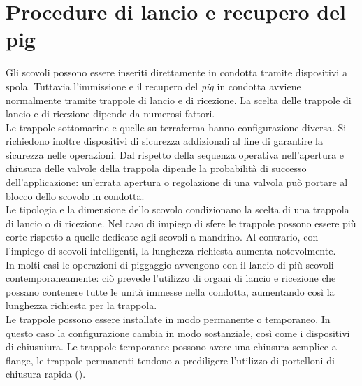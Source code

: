 
\section{Procedure di lancio e recupero del pig}
Gli scovoli possono essere inseriti direttamente in condotta tramite dispositivi a spola. Tuttavia l'immissione e il recupero del \textit{pig} in condotta avviene normalmente tramite trappole di lancio e di ricezione. La scelta delle trappole di lancio e di ricezione dipende da numerosi fattori.\\
Le trappole sottomarine e quelle su terraferma hanno configurazione diversa. Si richiedono inoltre dispositivi di sicurezza addizionali al fine di garantire la sicurezza nelle operazioni. Dal rispetto della sequenza operativa nell'apertura e chiusura delle valvole della trappola dipende la probabilità di successo dell'applicazione: un'errata apertura o regolazione di una valvola può portare al blocco dello scovolo in condotta.\\
Le tipologia e la dimensione dello scovolo condizionano la scelta di una trappola di lancio o di ricezione. Nel caso di impiego di sfere le trappole possono essere più corte rispetto a quelle dedicate agli scovoli a mandrino. Al contrario, con l'impiego di scovoli intelligenti, la lunghezza richiesta aumenta notevolmente.\\
In molti casi le operazioni di piggaggio avvengono con il lancio di più scovoli contemporaneamente: ciò prevede l'utilizzo di organi di lancio e ricezione che possano contenere tutte le unità immesse nella condotta, aumentando così la lunghezza richiesta per la trappola.\\
Le trappole possono essere installate in modo permanente o temporaneo. In questo caso la configurazione cambia in modo sostanziale, così come i dispositivi di chiusuiura. Le trappole temporanee possono avere una chiusura semplice a flange, le trappole permanenti tendono a prediligere l'utilizzo di portelloni di chiusura rapida ().
